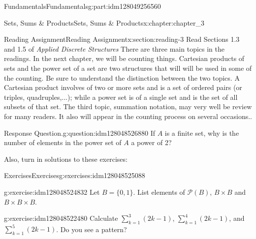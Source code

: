 \documentclass[oneside,10pt,]{book}
\numberwithin{equation}{section}
\begin{document}
\begin{partptx}{Fundamentals}{}{Fundamentals}{}{}{g:part:idm128049256560}
\begin{chapterptx}{Sets, Sums \& Products}{}{Sets, Sums \& Products}{}{}{x:chapter:chapter_3}
%
%
%
%
%
\typeout{************************************************}
\typeout{************************************************}
%
\begin{sectionptx}{Reading Assignment}{}{Reading Assignment}{}{}{x:section:reading-3}
Read Sections 1.3 and 1.5 of \emph{Applied Discrete Structures} There are three main topics in the readings.  In the next chapter, we will be counting things.  Cartesian products of sets and the power set of a set are two structures that will will be used in some of the counting.  Be sure to understand the distinction between the two topics.  A Cartesian product involves of two or more sets and is a set of ordered pairs (or triples, quadruples,...); while a power set is of a single set and is the set of all subsets of that set.    The third topic, summation notation, may very well be review for many readers. It also will appear in the counting process on several occasions..%
\begin{question}{Response Question.}{g:question:idm128048526880}%
If \(A\) is a finite set, why is the number of elements in the power set of \(A\) a power of 2?%
\end{question}
Also, turn in solutions to these exercises:%
%
%
\typeout{************************************************}
\typeout{************************************************}
%
\begin{exercises-subsection}{Exercises}{}{Exercises}{}{}{g:exercises:idm128048525088}
\par\medskip\noindent%
%
\begin{exercisegroup}
\begin{divisionexerciseeg}{1}{}{}{g:exercise:idm128048524832}%
Let \(B=\{0,1\}\).  List elements of  \(\mathcal{P}(B)\),  \(B\times B\) and \(B\times B\times B\).%
\end{divisionexerciseeg}%
\begin{divisionexerciseeg}{2}{}{}{g:exercise:idm128048522480}%
Calculate \(\sum_{k=1}^3 (2k-1)\), \(\sum_{k=1}^4 (2k-1)\), and \(\sum_{k=1}^5 (2k-1)\). Do you see a pattern?%
\end{divisionexerciseeg}%
\end{exercisegroup}
\par\medskip\noindent
\end{exercises-subsection}
\end{sectionptx}
%
%
\typeout{************************************************}

\end{chapterptx}
\end{partptx}
\end{document}
